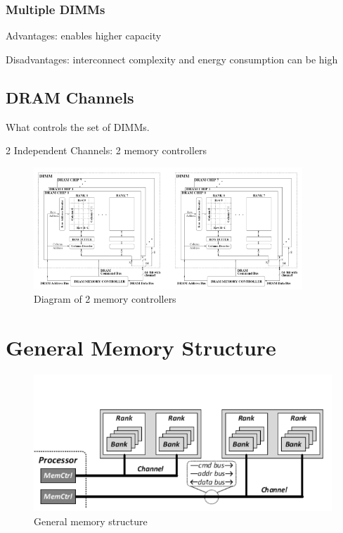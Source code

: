 \documentclass[]{article}
\begin{document}
\hypertarget{multiple-dimms}{%
\subsubsection{Multiple DIMMs}\label{multiple-dimms}}

Advantages: enables higher capacity

Disadvantages: interconnect complexity and energy consumption can be
high

\hypertarget{dram-channels}{%
\subsection{DRAM Channels}\label{dram-channels}}

What controls the set of DIMMs.

2 Independent Channels: 2 memory controllers

\begin{figure}
\centering
\includegraphics[width=0.9\textwidth,height=\textheight]{./tex2pdf.-ee748c56ff17e1e1/722152b1cbbf12340c2ad3f47168800019155bee.png}
\caption{Diagram of 2 memory controllers}
\end{figure}

\hypertarget{general-memory-structure}{%
\section{General Memory Structure}\label{general-memory-structure}}

\begin{figure}
\centering
\includegraphics{./tex2pdf.-ee748c56ff17e1e1/f97cc899e87e6e510f7ed5664052ddd0c66f5bfa.png}
\caption{General memory structure}
\end{figure}
\end{document}

